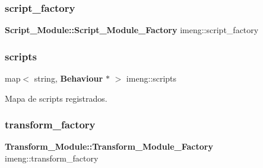 \subsubsection{script\_factory}
{\footnotesize\ttfamily \textbf{ Script\+\_\+\+Module\+::\+Script\+\_\+\+Module\+\_\+\+Factory} imeng\+::script\+\_\+factory}

\mbox{\label{namespaceimeng_ad408c15bc511533109f06d98e3be0c59}} 
\subsubsection{scripts}
{\footnotesize\ttfamily map$<$ string, \textbf{ Behaviour} $\ast$ $>$ imeng\+::scripts}



Mapa de scripts registrados. 

\mbox{\label{namespaceimeng_af8ba784f3aac236641eadcbeb3c9b962}} 
\subsubsection{transform\_factory}
{\footnotesize\ttfamily \textbf{ Transform\+\_\+\+Module\+::\+Transform\+\_\+\+Module\+\_\+\+Factory} imeng\+::transform\+\_\+factory}

